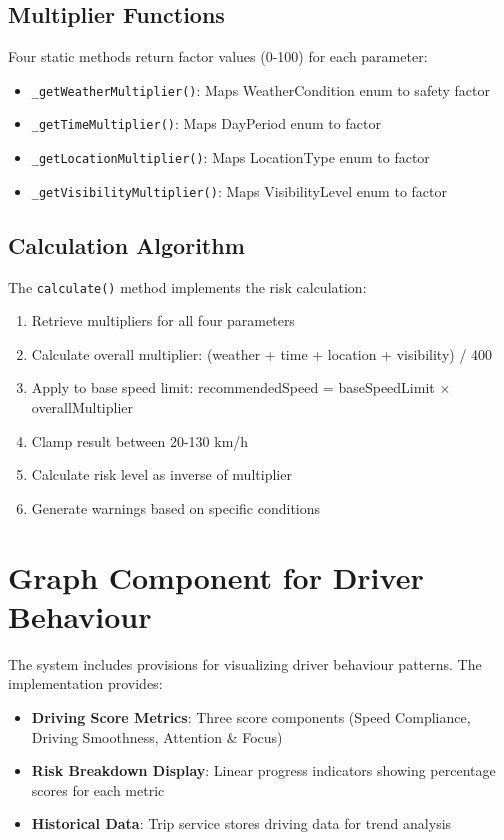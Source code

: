 \subsection{Multiplier Functions}
Four static methods return factor values (0-100) for each parameter:
\begin{itemize}
    \item \texttt{\_getWeatherMultiplier()}: Maps WeatherCondition enum to safety factor
    \item \texttt{\_getTimeMultiplier()}: Maps DayPeriod enum to factor
    \item \texttt{\_getLocationMultiplier()}: Maps LocationType enum to factor
    \item \texttt{\_getVisibilityMultiplier()}: Maps VisibilityLevel enum to factor
\end{itemize}

\subsection{Calculation Algorithm}
The \texttt{calculate()} method implements the risk calculation:
\begin{enumerate}
    \item Retrieve multipliers for all four parameters
    \item Calculate overall multiplier: (weather + time + location + visibility) / 400
    \item Apply to base speed limit: recommendedSpeed = baseSpeedLimit × overallMultiplier
    \item Clamp result between 20-130 km/h
    \item Calculate risk level as inverse of multiplier
    \item Generate warnings based on specific conditions
\end{enumerate}

\section{Graph Component for Driver Behaviour}
The system includes provisions for visualizing driver behaviour patterns. The implementation provides:

\begin{itemize}
    \item \textbf{Driving Score Metrics}: Three score components (Speed Compliance, Driving Smoothness, Attention \& Focus)
    \item \textbf{Risk Breakdown Display}: Linear progress indicators showing percentage scores for each metric
    \item \textbf{Historical Data}: Trip service stores driving data for trend analysis
\end{itemize}


